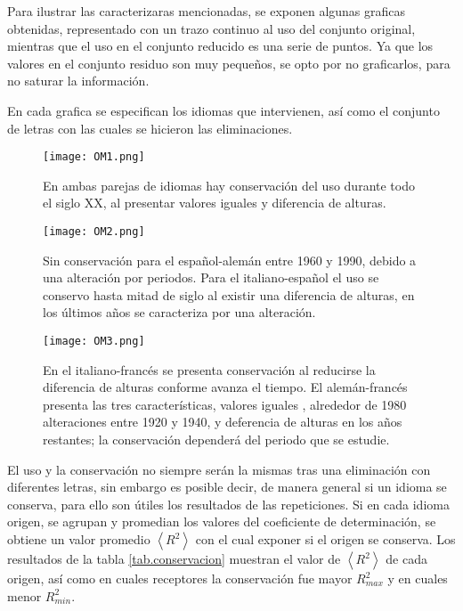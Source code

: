 Para ilustrar las caracterizaras mencionadas, se exponen algunas graficas obtenidas, representado con un trazo continuo al uso del conjunto original, mientras que el uso en el conjunto reducido  es una serie de puntos.   Ya que los valores en el conjunto residuo son muy pequeños, se opto por no graficarlos, para no saturar la información. 

En cada grafica se especifican los idiomas que intervienen, así como el conjunto de letras con las cuales se hicieron las eliminaciones. 



\begin{figure}[h!]
	\centering
	\texttt{[image: OM1.png]}
	\label{fig.OM1}
	\caption{En ambas parejas de idiomas hay conservación del uso durante todo el siglo XX, al presentar valores iguales y  diferencia de alturas.}
\end{figure}


\begin{figure}[h!]
	\centering
	\texttt{[image: OM2.png]}
	\label{fig.OM2}
	\caption{Sin conservación para el español-alemán entre 1960 y 1990,  debido a una alteración por periodos. Para el italiano-español el uso se conservo hasta mitad de siglo al existir una diferencia de alturas, en los últimos años se caracteriza por una alteración.}
\end{figure}

\clearpage
\begin{figure}[h!]
	\centering
	\texttt{[image: OM3.png]}
	\label{fig.OM3}
	\caption{ En el italiano-francés se presenta conservación al  reducirse la diferencia de alturas conforme avanza el tiempo. El alemán-francés  presenta las tres características,  valores iguales  , alrededor de 1980  alteraciones entre 1920 y 1940, y deferencia de alturas  en los años restantes; la conservación dependerá del periodo  que se estudie.}
\end{figure}




El uso y la conservación no siempre serán la mismas tras una eliminación con diferentes letras, sin embargo es posible decir, de manera general si un idioma se conserva, para ello son útiles los resultados de las repeticiones. Si en cada idioma origen, se agrupan y promedian los valores del coeficiente de determinación,  se obtiene un valor promedio $\left \langle R^{2}  \right \rangle$ con el cual exponer si el origen se conserva.  Los resultados de la tabla \ref{tab.conservacion} muestran el valor de  $\left \langle R^{2} \right \rangle$ de cada origen,  así como en cuales receptores la conservación fue mayor $R^{2}_{max}$ y en cuales menor $R^{2}_{min}$.





